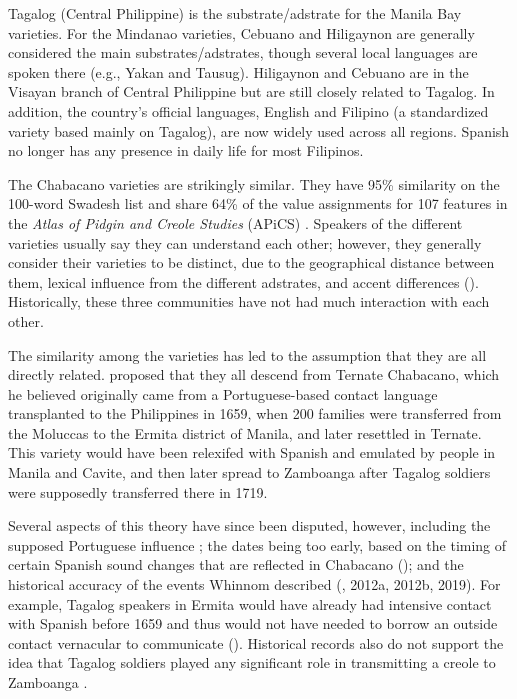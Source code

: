 Tagalog (Central Philippine) is the substrate/adstrate for the Manila Bay varieties. For the Mindanao varieties, Cebuano and Hiligaynon are generally considered the main substrates/adstrates, though several local languages are spoken there (e.g., Yakan and Tausug). Hiligaynon and Cebuano are in the Visayan branch of Central Philippine but are still closely related to Tagalog. In addition, the country's official languages, English and Filipino (a standardized variety based mainly on Tagalog), are now widely used across all regions. Spanish no longer has any presence in daily life for most Filipinos.

The Chabacano varieties are strikingly similar. They have 95\% similarity on the 100-word Swadesh list \citep[27]{Sippola2011} and share 64\% of the value assignments for 107 features in the \textit{Atlas of Pidgin and Creole Studies} (APiCS) \citep{MichaelisEtAl2013}. Speakers of the different varieties usually say they can understand each other; however, they generally consider their varieties to be distinct, due to the geographical distance between them, lexical influence from the different adstrates, and accent differences (\citealt{LeshoSippola2014}). Historically, these three communities have not had much interaction with each other.

The similarity among the varieties has led to the assumption that they are all directly related. \citet{Whinnom1956} proposed that they all descend from Ternate Chabacano, which he believed originally came from a Portuguese-based contact language transplanted to the Philippines in 1659, when 200 families were transferred from the Moluccas to the Ermita district of Manila, and later resettled in Ternate. This variety would have been relexifed with Spanish and emulated by people in Manila and Cavite, and then later spread to Zamboanga after Tagalog soldiers were supposedly transferred there in 1719. 

Several aspects of this theory have since been disputed, however, including the supposed Portuguese influence \citep{Lipski1988}; the dates being too early, based on the timing of certain Spanish sound changes that are reflected in Chabacano (\citealt{FernándezSippola2017}); and the historical accuracy of the events Whinnom described (\citealt{Fernández2006,20112006}, 2012a, 2012b, 2019). For example, Tagalog speakers in Ermita would have already had intensive contact with Spanish before 1659 and thus would not have needed to borrow an outside contact vernacular to communicate (\citealt{Fernández2011,2012a2011}). Historical records also do not support the idea that Tagalog soldiers played any significant role in transmitting a creole to Zamboanga \citep{Fernández2019}. 

